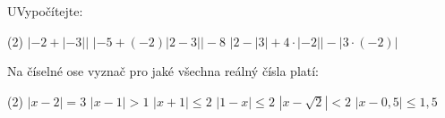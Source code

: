 \documentclass[12pt,a4paper]{article}
\begin{document}
\begin{exercise}
    UVypočítejte:
    \begin{tasks}(2)
        \task $\left\lvert -2+\left\lvert -3\right\rvert\right\rvert$
        \task $\left\lvert -5+(-2)\left\lvert2 -3\right\rvert\right\rvert-8$
        \task $\left\lvert 2-\left\lvert3\right\rvert+4\cdot \left\lvert -2\right\rvert\right\rvert - \left\lvert3\cdot(-2) \right\rvert$
    \end{tasks}
\end{exercise}

\begin{exercise}
    Na číselné ose vyznač pro jaké všechna reálný čísla platí:
    \begin{tasks}(2)
        \task $\left\lvert x-2\right\rvert = 3$
        \task $\left\lvert x-1\right\rvert > 1$
        \task $\left\lvert x+1\right\rvert \leq 2$
        \task $\left\lvert 1-x\right\rvert \leq 2$
        \task $\left\lvert x-\sqrt{2}\right\rvert < 2$
        \task $\left\lvert x-0,5\right\rvert \leq 1,5$
    \end{tasks}
\end{exercise}
\end{document}
